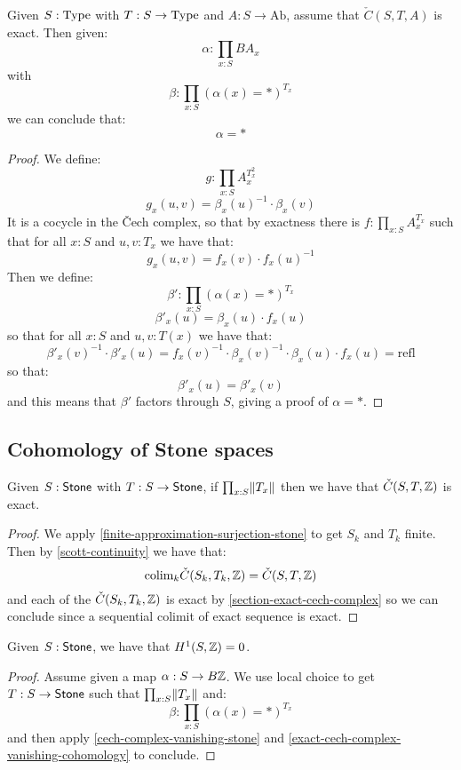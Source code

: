 \begin{lemma}\label{exact-cech-complex-vanishing-cohomology}
Given $S:\mathrm{Type}$ with $T:S\to \mathrm{Type}$ and $A:S\to\mathrm{Ab}$, assume that $\check{C}(S,T,A)$ is exact. Then given:
\[\alpha:\prod_{x:S}BA_x\]
with
\[\beta: \prod_{x:S} (\alpha(x) = *)^{T_x}\]
we can conclude that:
\[\alpha = *\]
\end{lemma}

\begin{proof}
We define:
\[g : \prod_{x:S} A_x^{T_x^2}\]
\[g_x(u,v) = \beta_x(u)^{-1}\cdot\beta_x(v)\] 
It is a cocycle in the \v{C}ech complex, so that by exactness there is $f:\prod_{x:S}A_x^{T_x}$ such that for all $x:S$ and $u,v:T_x$ we have that:
\[g_x(u,v)=f_x(v)\cdot f_x(u)^{-1}\]
Then we define:
\[\beta' : \prod_{x:S}(\alpha(x)=*)^{T_x}\]
\[\beta'_x(u) = \beta_x(u)\cdot f_x(u)\]
so that for all $x:S$ and $u,v:T(x)$ we have that:
\[\beta'_x(v)^{-1}\cdot\beta'_x(u) = f_x(v)^{-1}\cdot\beta_x(v)^{-1}\cdot\beta_x(u)\cdot f_x(u) = \mathrm{refl}\]
so that:
\[\beta'_x(u)=\beta'_x(v)\]
and this means that $\beta'$ factors through $S$, giving a proof of $\alpha = *$.
\end{proof}


\subsection{Cohomology of Stone spaces}

\begin{lemma}\label{cech-complex-vanishing-stone}
Given $S:\mathsf{Stone}$ with $T:S\to\mathsf{Stone}$, if $\prod_{x:S}\lVert T_x \rVert$ then we have that $\check{C}(S,T,\mathbb{Z})$ is exact.
\end{lemma}

\begin{proof}
We apply \cref{finite-approximation-surjection-stone} to get $S_k$ and $T_k$ finite. Then by \cref{scott-continuity} we have that:
\[\mathrm{colim}_k \check{C}(S_k,T_k,\mathbb{Z}) = \check{C}(S,T,\mathbb{Z})\]
and each of the $\check{C}(S_k,T_k,\mathbb{Z})$ is exact by \cref{section-exact-cech-complex} so we can conclude since a sequential colimit of exact sequence is exact.
\end{proof}

\begin{lemma}\label{eilenberg-stone-vanish}
Given $S:\mathsf{Stone}$, we have that $H^1(S,\mathbb{Z}) = 0$. 
\end{lemma}

\begin{proof}
Assume given a map $\alpha:S\to B\mathbb{Z}$. We use local choice to get $T:S\to\mathsf{Stone}$ such that $\prod_{x:S}\lVert T_x \rVert$ and:
\[\beta:\prod_{x:S}(\alpha(x)=*)^{T_x}\]
and then apply \cref{cech-complex-vanishing-stone} and \cref{exact-cech-complex-vanishing-cohomology} to conclude.
\end{proof}

